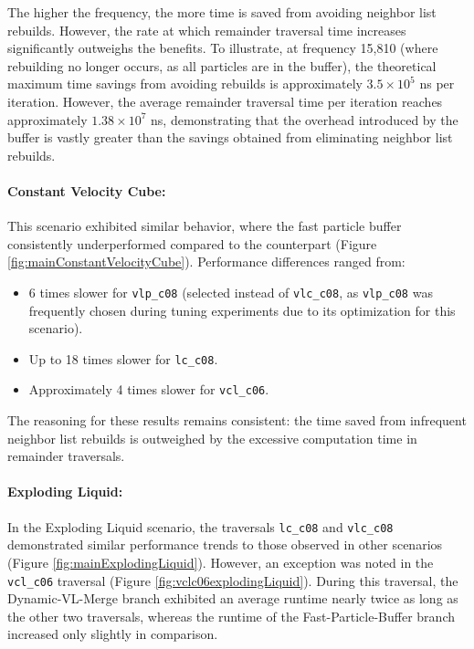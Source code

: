 The higher the frequency, the more time is saved from avoiding neighbor list rebuilds. However, the rate at which remainder traversal time increases significantly outweighs the benefits. To illustrate, at frequency 15,810 (where rebuilding no longer occurs, as all particles are in the buffer), the theoretical maximum time savings from avoiding rebuilds is approximately $3.5 \times 10^5$ ns per iteration. However, the average remainder traversal time per iteration reaches approximately $1.38 \times 10^7$ ns, demonstrating that the overhead introduced by the buffer is vastly greater than the savings obtained from eliminating neighbor list rebuilds.

\paragraph{Constant Velocity Cube:}

This scenario exhibited similar behavior, where the fast particle buffer consistently underperformed compared to the counterpart (Figure \ref{fig:mainConstantVelocityCube}). Performance differences ranged from:
\begin{itemize}
    \item 6 times slower for \texttt{vlp\_c08} (selected instead of \texttt{vlc\_c08}, as \texttt{vlp\_c08} was frequently chosen during tuning experiments due to its optimization for this scenario).
    \item Up to 18 times slower for \texttt{lc\_c08}.
    \item Approximately 4 times slower for \texttt{vcl\_c06}.
\end{itemize}

The reasoning for these results remains consistent: the time saved from infrequent neighbor list rebuilds is outweighed by the excessive computation time in remainder traversals.

\paragraph{Exploding Liquid:} \label{para:exploding_liquid}
In the Exploding Liquid scenario, the traversals \texttt{lc\_c08} and \texttt{vlc\_c08} demonstrated similar performance trends to those observed in other scenarios (Figure \ref{fig:mainExplodingLiquid}). However, an exception was noted in the \texttt{vcl\_c06} traversal (Figure \ref{fig:vclc06explodingLiquid}). During this traversal, the Dynamic-VL-Merge branch exhibited an average runtime nearly twice as long as the other two traversals, whereas the runtime of the Fast-Particle-Buffer branch increased only slightly in comparison.

